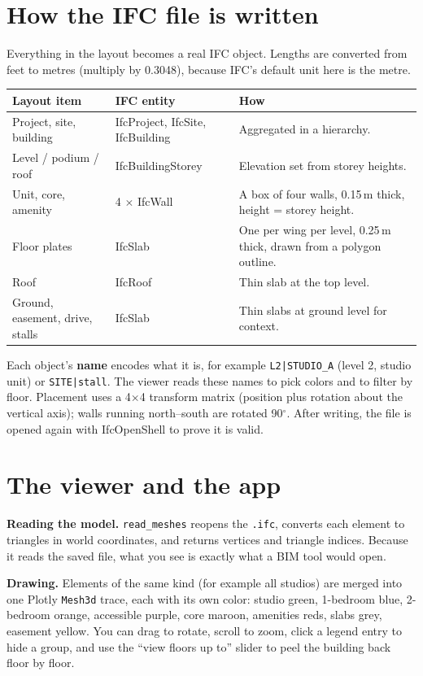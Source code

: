 \documentclass[11pt]{article}
\begin{document}
\section{How the IFC file is written}
Everything in the layout becomes a real IFC object. Lengths are converted from feet to metres (multiply by 0.3048), because IFC's default unit here is the metre.
\begin{table}[H]\centering\small
\begin{tabular}{@{}llp{7.5cm}@{}}\toprule
Layout item & IFC entity & How \\ \midrule
Project, site, building & IfcProject, IfcSite, IfcBuilding & Aggregated in a hierarchy. \\
Level / podium / roof & IfcBuildingStorey & Elevation set from storey heights. \\
Unit, core, amenity & 4 $\times$ IfcWall & A box of four walls, 0.15\,m thick, height = storey height. \\
Floor plates & IfcSlab & One per wing per level, 0.25\,m thick, drawn from a polygon outline. \\
Roof & IfcRoof & Thin slab at the top level. \\
Ground, easement, drive, stalls & IfcSlab & Thin slabs at ground level for context. \\ \bottomrule
\end{tabular}\end{table}
Each object's \textbf{name} encodes what it is, for example \texttt{L2|STUDIO\_A} (level 2, studio unit) or \texttt{SITE|stall}. The viewer reads these names to pick colors and to filter by floor.
Placement uses a 4$\times$4 transform matrix (position plus rotation about the vertical axis); walls running north--south are rotated 90$^\circ$. After writing, the file is opened again with IfcOpenShell to prove it is valid.

\section{The viewer and the app}
\textbf{Reading the model.} \texttt{read\_meshes} reopens the \texttt{.ifc}, converts each element to triangles in world coordinates, and returns vertices and triangle indices. Because it reads the saved file, what you see is exactly what a BIM tool would open.

\textbf{Drawing.} Elements of the same kind (for example all studios) are merged into one Plotly \texttt{Mesh3d} trace, each with its own color: studio green, 1-bedroom blue, 2-bedroom orange, accessible purple, core maroon, amenities reds, slabs grey, easement yellow.
You can drag to rotate, scroll to zoom, click a legend entry to hide a group, and use the ``view floors up to'' slider to peel the building back floor by floor.
\end{document}
